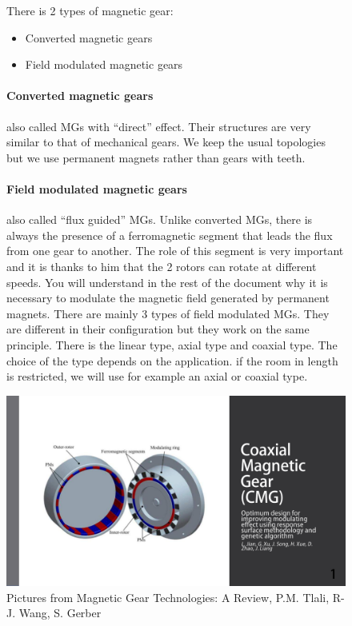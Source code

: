 \begin{figure}[H]
    \begin{minipage}{.45\linewidth}
        
        There is 2 types of magnetic gear: 
        \begin{itemize}
            \item Converted magnetic gears
            \item Field modulated magnetic gears
        \end{itemize}
        
        \paragraph{Converted magnetic gears} also called MGs with ``direct'' effect. Their structures are very similar to that of mechanical gears. We keep the usual topologies but we use permanent magnets rather than gears with teeth.
        
        \paragraph {Field modulated magnetic gears} also called ``flux guided'' MGs. Unlike converted MGs, there is always the presence of a ferromagnetic segment that leads the flux from one gear to another. The role of this segment is very important and it is thanks to him that the 2 rotors can rotate at different speeds. You will understand in the rest of the document why it is necessary to modulate the magnetic field generated by permanent magnets. There are mainly 3 types of field modulated MGs. They are different in their configuration but they work on the same principle. There is the linear type, axial type and coaxial type. The choice of the type depends on the application. if the room in length is restricted, we will use for example an axial or coaxial type.
        
    \end{minipage}
    \hfill%
    \begin{minipage}[c]{.45\linewidth}
        \centering
        \includegraphics[page={6},width=\textwidth]{LELEC2311.allow.pdf}
        \caption{Pictures from Magnetic Gear Technologies: A Review, P.M. Tlali, R-J. Wang, S. Gerber}
    \end{minipage}
\end{figure}


